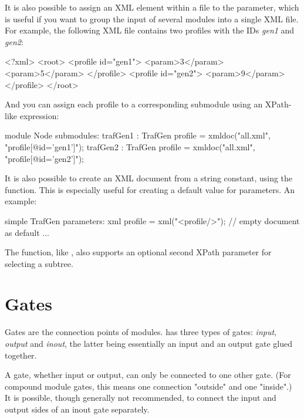 It is also possible to assign an XML element within a file to the parameter,
which is useful if you want to group the input of several modules into
a single XML file. For example, the following XML file contains two profiles
with the IDs \textit{gen1} and \textit{gen2}:

\begin{filelisting}
<?xml>
<root>
    <profile id="gen1">
          <param>3</param>
          <param>5</param>
    </profile>
    <profile id="gen2">
          <param>9</param>
    </profile>
</root>
\end{filelisting}

And you can assign each profile to a corresponding submodule using an XPath-like
expression:

\begin{ned}
module Node {
    submodules:
        trafGen1 : TrafGen {
            profile = xmldoc("all.xml", "profile[@id='gen1']");
        }
        trafGen2 : TrafGen {
            profile = xmldoc("all.xml", "profile[@id='gen2']");
        }
}
\end{ned}

It is also possible to create an XML document from a string constant, using
the  function. This is especially useful for creating a
default value for  parameters. An example:

\begin{ned}
simple TrafGen {
    parameters:
        xml profile = xml("<profile/>"); // empty document as default
        ...
}
\end{ned}

The  function, like , also supports an
optional second XPath parameter for selecting a subtree.




\section{Gates}
\label{sec:ch-ned-lang:gates}

Gates are the connection points of modules.  {\opp} has three types of
gates: \textit{input}, \textit{output} and \textit{inout}, the latter being
essentially an input and an output gate glued together.

A gate, whether input or output, can only be connected to one other
gate. (For compound module gates, this means one connection "outside" and
one "inside".)  It is possible, though generally not recommended, to
connect the input and output sides of an inout gate separately.

